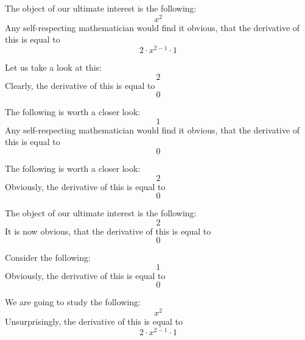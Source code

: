 \documentclass{article}
\begin{document}
The object of our ultimate interest is the following:
\begin{equation}
x ^{2 } 
\end{equation}
Any self-respecting mathematician would find it obvious, that the derivative of this is equal to
\begin{equation}
2 \cdot x ^{2 - 1 } \cdot 1 
\end{equation}

Let us take a look at this:
\begin{equation}
2 
\end{equation}
Clearly, the derivative of this is equal to
\begin{equation}
0 
\end{equation}

The following is worth a closer look:
\begin{equation}
1 
\end{equation}
Any self-respecting mathematician would find it obvious, that the derivative of this is equal to
\begin{equation}
0 
\end{equation}

The following is worth a closer look:
\begin{equation}
2 
\end{equation}
Obviously, the derivative of this is equal to
\begin{equation}
0 
\end{equation}

The object of our ultimate interest is the following:
\begin{equation}
2 
\end{equation}
It is now obvious, that the derivative of this is equal to
\begin{equation}
0 
\end{equation}

Consider the following:
\begin{equation}
1 
\end{equation}
Obviously, the derivative of this is equal to
\begin{equation}
0 
\end{equation}

We are going to study the following:
\begin{equation}
x ^{2 } 
\end{equation}
Unsurprisingly, the derivative of this is equal to
\begin{equation}
2 \cdot x ^{2 - 1 } \cdot 1 
\end{equation}
\end{document}
